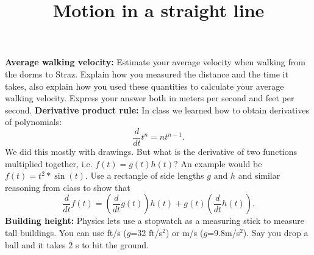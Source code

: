 \documentclass{handout}
\title{Motion in a straight line}
\begin{document}
\maketitle

\hwinstructions

\begin{questions}
    \question \textbf{Average walking velocity:} Estimate your average velocity when walking from the dorms to Straz. Explain how you measured the distance and the time it takes, also explain how you used these quantities to calculate your average walking velocity. Express your answer both in meters per second and feet per second.
    \question \textbf{Derivative product rule:} In class we learned how to obtain derivatives of polynomials: $$\frac{d}{dt} t^n=nt^{n-1}.$$
    We did this mostly with drawings. But what is the derivative of two functions multiplied together, i.e. $f(t)=g(t)h(t)$? An example would be $f(t)=t^2 *\sin(t)$. Use a rectangle of side lengths $g$ and $h$ and similar reasoning from class to show that
    $$
    \frac{d}{dt}f(t)=\left(\frac{d}{dt}g(t)\right)h(t) + g(t)\left(\frac{d}{dt}h(t)\right).
    $$
    \question \textbf{Building height:} Physics lets use a stopwatch as a measuring stick to measure tall buildings. You can use ft/s ($g$=32 ft/s$^2$) or m/s ($g$=9.8m/s$^2$). Say you drop a ball and it takes 2 s to hit the ground.


\end{questions}
\end{document}
